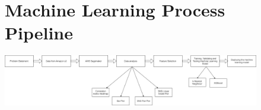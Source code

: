     
\begin{landscape}
\begin{figure}[ht]
\begin{minipage}{\linewidth}
\section{Machine Learning Process Pipeline}

   \centering
    \includegraphics[width=0.99\linewidth]{pages/Chapter3/Chapter 3 images/Ml.png}
    
    \label{appendix:ML process pipeline}

\end{minipage}
\end{figure}
    \end{landscape}
    
    

    
    

    
    
